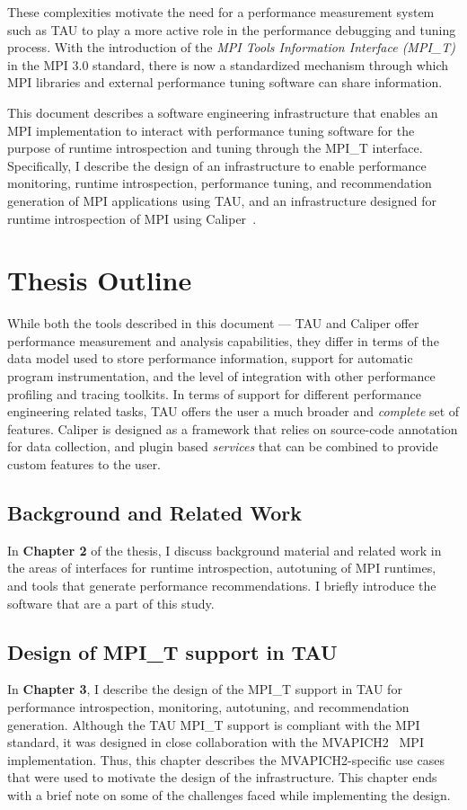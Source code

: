 These complexities motivate the need for a performance measurement system such as TAU to play a more active role in the performance debugging and tuning process. With the introduction of the \textit{MPI Tools Information Interface (MPI\_T)} in the MPI 3.0 standard, there is now a standardized mechanism through which MPI libraries and external performance tuning software can share information. 
\par This document describes a software engineering infrastructure that enables an MPI implementation to interact with performance tuning software for the purpose of runtime introspection and tuning through the MPI\_T interface. Specifically, I describe the design of an infrastructure to enable performance monitoring, runtime introspection, performance tuning, and recommendation generation of MPI applications using TAU, and an infrastructure designed for runtime introspection of MPI using Caliper~\cite{CALIPER}.

\section {Thesis Outline}
While both the tools described in this document --- TAU and Caliper offer performance measurement and analysis capabilities, they differ in terms of the data model used to store performance information, support for automatic program instrumentation, and the level of integration with other performance profiling and tracing toolkits. In terms of support for different performance engineering related tasks, TAU offers the user a much broader and \textit{complete} set of features. Caliper is designed as a framework that relies on source-code annotation for data collection, and plugin based \textit{services} that can be combined to provide custom features to the user.

\subsection {Background and Related Work}
In \textbf{Chapter 2} of the thesis, I discuss background material and related work in the areas of interfaces for runtime introspection, autotuning of MPI runtimes, and tools that generate performance recommendations. I briefly introduce the  software that are a part of this study.

\subsection {Design of MPI\_T support in TAU}
In \textbf{Chapter 3}, I describe the design of the MPI\_T support in TAU for performance introspection, monitoring, autotuning, and recommendation generation. Although the TAU MPI\_T support is compliant with the MPI standard, it was designed in close collaboration with the MVAPICH2~\cite{MVAPICH2} MPI implementation. Thus, this chapter describes the MVAPICH2-specific use cases that were used to motivate the design of the infrastructure. This chapter ends with a brief note on some of the challenges faced while implementing the design.

